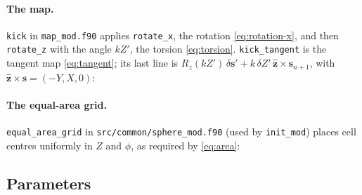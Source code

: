 \documentclass[11pt,a4paper]{article}
\newcommand{\vs}{\bm{s}}
\begin{document}
\paragraph{The map.} \texttt{kick} in \texttt{map\_mod.f90} applies \texttt{rotate\_x}, the rotation
\eqref{eq:rotation-x}, and then \texttt{rotate\_z} with the angle $kZ'$, the torsion \eqref{eq:torsion}.
\texttt{kick\_tangent} is the tangent map \eqref{eq:tangent}; its last line is $R_z(kZ')\,\delta\vs' + k\,\delta Z'\,
\hat{\bm z}\times\vs_{n+1}$, with $\hat{\bm z}\times\vs = (-Y, X, 0)$:


\paragraph{The equal-area grid.} \texttt{equal\_area\_grid} in \texttt{src/common/sphere\_mod.f90} (used by \texttt{init\_mod}) places cell centres uniformly in
$Z$ and $\phi$, as required by \eqref{eq:area}:


\subsection{Parameters}
\end{document}
